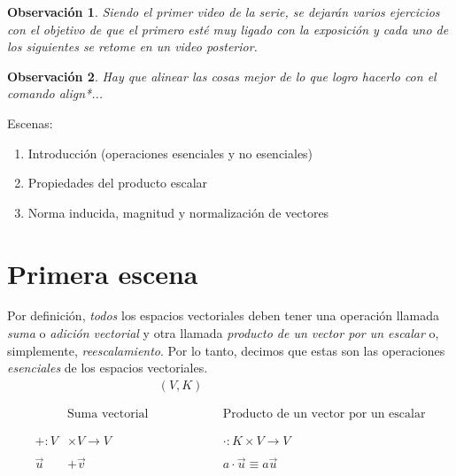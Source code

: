 \documentclass[12pt,dvipsnames]{article}
\newtheorem{obs}{Observación}[section]
\numberwithin{equation}{section}
\begin{document}
\begin{obs}
Siendo el primer video de la serie, se dejarán varios ejercicios con el objetivo de que el primero esté muy ligado con la exposición y cada uno de los siguientes se retome en un video posterior.
\end{obs}

\begin{obs}
Hay que alinear las cosas mejor de lo que logro hacerlo con el comando align*...
\end{obs}

Escenas:

\begin{enumerate}
    \item Introducción (operaciones esenciales y no esenciales) 
    \item Propiedades del producto escalar
    \item Norma inducida, magnitud y normalización de vectores
\end{enumerate}


\newpage
\section{Primera escena}

Por definición, \emph{todos} los espacios vectoriales deben tener una operación llamada \emph{suma} o \emph{adición vectorial} y otra llamada \emph{producto de un vector por un escalar} o, simplemente, \emph{reescalamiento}. Por lo tanto, decimos que estas son las operaciones \emph{esenciales} de los espacios vectoriales.
\begin{align*}
    & &(V,K)& & \\
    \\
    \\
    &\text{Suma vectorial} & & &\text{Producto de un vector por un escalar}\\
    \\
    \\
    +:V&\times V\to V && &\cdot:K\times V\to V \\
    \\
    \vec{u}&+\vec{v} && &a\cdot\vec{u}\equiv a\vec{u}
\end{align*}
\end{document}
